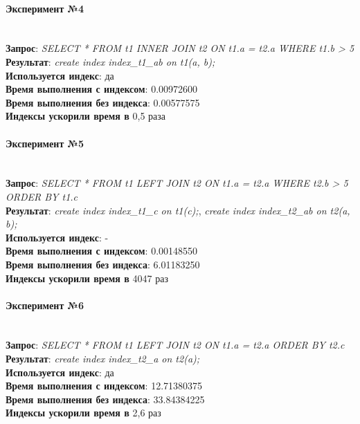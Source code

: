 \paragraph{Эксперимент №4}\\
\textbf{Запрос}: \textit{SELECT * FROM t1 INNER JOIN t2 ON t1.a = t2.a WHERE t1.b > 5}\\
\textbf{Результат}: \textit{create index index_t1_ab on t1(a, b);}\\
\textbf{Используется индекс}: да\\
\textbf{Время выполнения с индексом}: 0.00972600\\
\textbf{Время выполнения без индекса}: 0.00577575\\
\textbf{Индексы ускорили время в} 0,5 раза\\

\paragraph{Эксперимент №5}\\
\textbf{Запрос}: \textit{SELECT * FROM t1 LEFT JOIN t2 ON t1.a = t2.a WHERE t2.b > 5 ORDER BY t1.c}\\
\textbf{Результат}: \textit{create index index_t1_c on t1(c);}, \textit{create index index_t2_ab on t2(a, b);}\\
\textbf{Используется индекс}: -\\
\textbf{Время выполнения с индексом}: 0.00148550\\
\textbf{Время выполнения без индекса}: 6.01183250\\
\textbf{Индексы ускорили время в} 4047 раз\\

\paragraph{Эксперимент №6}\\
\textbf{Запрос}: \textit{SELECT * FROM t1 LEFT JOIN t2 ON t1.a = t2.a ORDER BY t2.c}\\
\textbf{Результат}: \textit{create index index_t2_a on t2(a);}\\
\textbf{Используется индекс}: да\\
\textbf{Время выполнения с индексом}: 12.71380375\\
\textbf{Время выполнения без индекса}: 33.84384225\\
\textbf{Индексы ускорили время в} 2,6 раз\\

